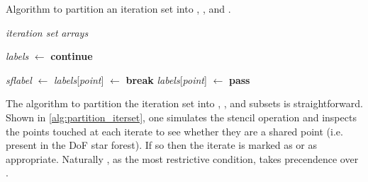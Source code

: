 \documentclass[thesis]{subfiles}
\begin{document}
\begin{algorithm}
  \caption{
    Algorithm to partition an iteration set into \coreiter, \rootiter, and \leafiter.
  }
  \begin{algorithmic}[1]
    \Require \textit{iteration set}
    \Require \textit{arrays} 

    \State \textit{labels} $\gets$  
          \State \textbf{continue}
        \EndIf

          \State \textit{sflabel} $\gets$ 
            \State \textit{labels}[\textit{point}] $\gets$ \leafiter
            \State \textbf{break} 
            \State \textit{labels}[\textit{point}] $\gets$ \rootiter
          \Else
            \State \textbf{pass} 
          \EndIf
        \EndFor
      \EndFor
    \EndFor
  \end{algorithmic}
  \label{alg:partition_iterset}
\end{algorithm}

The algorithm to partition the iteration set into \coreiter, \rootiter, and \leafiter subsets is straightforward.
Shown in \cref{alg:partition_iterset}, one simulates the stencil operation and inspects the points touched at each iterate to see whether they are a shared point (i.e. present in the DoF star forest).
If so then the iterate is marked as \rootiter or \leafiter as appropriate.
Naturally \leafiter, as the most restrictive condition, takes precendence over \rootiter.
\end{document}
